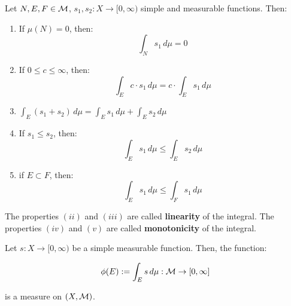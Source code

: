 \begin{fproperties}
    Let $N, E, F \in \mathcal{M}$, $s_1, s_2: X \to [0, \infty)$ simple and measurable functions. Then:
    \vspace{1em}

    \begin{enumerate}[label=(\roman*)]
        \item If $\mu(N) = 0$, then:
        $$\int_{N} s_1 \, d\mu = 0$$
        \vspace{1em}

        \item If $0 \leq c \leq \infty$, then:
        $$\int_{E} c \cdot s_1 \, d\mu = c \cdot \int_{E} s_1 \, d\mu$$
        \vspace{1em}

        \item $\int_{E} (s_1 + s_2) \, d\mu = \int_{E} s_1 \, d\mu + \int_{E} s_2 \, d\mu$
        \vspace{1em}

        \item If $s_1 \leq s_2$, then:
        $$\int_{E} s_1 \, d\mu \leq \int_{E} s_2 \, d\mu$$
        \vspace{1em}

        \item if $E \subset F$, then:
        $$\int_{E} s_1 \, d\mu \leq \int_{F} s_1 \, d\mu$$
    \end{enumerate}

    The properties $(ii)$ and $(iii)$ are called \textbf{linearity} of the integral.
    The properties $(iv)$ and $(v)$ are called \textbf{monotonicity} of the integral.

\end{fproperties}

\vspace{1em}

\begin{fproposition}
    Let $s: X \to [0, \infty)$ be a simple measurable function. Then, the function:

    $$\phi(E) := \int_{E} s \, d\mu: \mathcal{M} \to [0, \infty]$$

    is a measure on $(X, \mathcal{M})$.
\end{fproposition}

